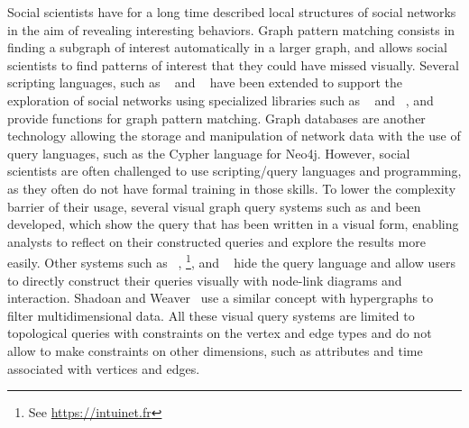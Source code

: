 
Social scientists have for a long time described local structures of social networks in the aim of revealing interesting behaviors\cite{hollandLocalStructureSocial1976}.
Graph pattern matching consists in finding a subgraph of interest automatically in a larger graph\cite{fanGraphPatternMatching2012}, and allows social scientists to find patterns of interest that they could have missed visually.
Several scripting languages, such as ~\cite{Rstat} and ~\cite{Python} have been extended to support the exploration of social networks using specialized libraries such as ~\cite{igraph} and ~\cite{networkx}, and provide functions for graph pattern matching.
Graph databases are another technology allowing the storage and manipulation of network data with the use of query languages, such as the Cypher language for Neo4j\cite{neo4j}.
However, social scientists are often challenged to use scripting/query languages and programming, as they often do not have formal training in those skills.
To lower the complexity barrier of their usage, several visual graph query systems such as \cite{holleisQUOGGLESQueryGraphs2005} and  been developed, which show the query that has been written in a visual form, enabling analysts to reflect on their constructed queries and explore the results more easily.
Other systems such as ~\cite{chauGRAPHITEVisualQuery2008}, \footnote{See \url{https://intuinet.fr}}, and ~\cite{cuencaVERTIGoVisualPlatform2021} hide the query language and allow users to directly construct their queries visually with node-link diagrams and interaction.
Shadoan and Weaver~\cite{shadoanVisualAnalysisHigherOrder2013} use a similar concept with hypergraphs to filter multidimensional data.
All these visual query systems are limited to topological queries with constraints on the vertex and edge types and do not allow to make constraints on other dimensions, such as attributes and time associated with vertices and edges.

